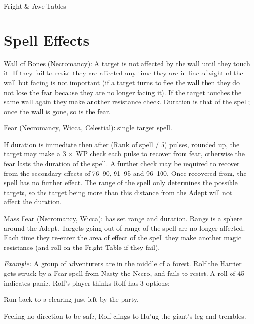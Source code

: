 \begin{Tables}{Fright \& Awe Tables}
\begin{multicols}{3}
\end{multicols}


\section{Spell Effects}
\begin{multicols}{3}
\begin{Itemize}

\item Wall of Bones (Necromancy): A target is not affected by the wall
  until they touch it. If they fail to resist they are affected any
  time they are in line of sight of the wall but facing is not
  important (if a target turns to flee the wall then they do not lose
  the fear because they are no longer facing it). If the target
  touches the same wall again they make another resistance
  check. Duration is that of the spell; once the wall is gone, so is
  the fear.

\item Fear (Necromancy, Wicca, Celestial): single target spell.

If duration is immediate then after (Rank of spell / 5) pulses,
rounded up, the target may make a 3 × WP check each pulse to recover
from fear, otherwise the fear lasts the duration of the spell.  A
further check may be required to recover from the secondary effects of
76--90, 91--95 and 96--100.  Once recovered from, the spell has no
further effect.  The range of the spell only determines the possible
targets, so the target being more than this distance from the Adept
will not affect the duration.

\item Mass Fear (Necromancy, Wicca): has set range and duration. Range
  is a sphere around the Adept.  Targets going out of range of the
  spell are no longer affected. Each time they re-enter the area of
  effect of the spell they make another magic resistance (and roll on
  the Fright Table if they fail).
\end{Itemize}

\emph{Example:} A group of adventurers are in the middle of a
forest. Rolf the Harrier gets struck by a Fear spell from Nasty the
Necro, and fails to resist.  A roll of 45 indicates panic. Rolf’s
player thinks Rolf has 3 options:
\begin{Itemize}
\item Run back to a clearing just left by the party. 

\item Feeling no direction to be safe, Rolf clings to Hu’ug the 
giant’s leg and trembles. 


\end{Itemize}
\end{multicols}
\end{Tables}
